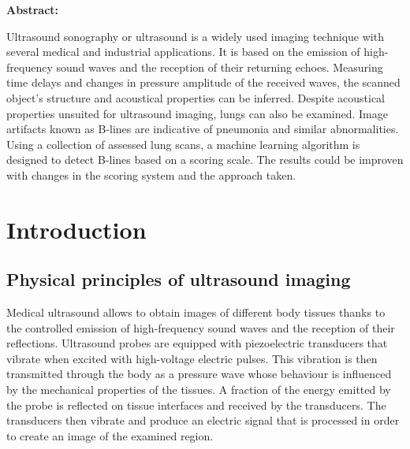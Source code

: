 \documentclass[12pt]{article} %
\begin{document}
{\bfseries \large Abstract: }\vspace{5mm} 

Ultrasound sonography or ultrasound is a widely used imaging technique with several medical and industrial applications. It is based on the emission of high-frequency sound waves and the reception of their returning echoes. Measuring time delays and changes in pressure amplitude of the received waves, the scanned object's structure and acoustical properties can be inferred. Despite acoustical properties unsuited for ultrasound imaging, lungs can also be examined. Image artifacts known as B-lines are indicative of pneumonia and similar abnormalities. Using a collection of assessed lung scans, a machine learning algorithm is designed to detect B-lines based on a scoring scale. The results could be improven with changes in the scoring system and the approach taken.
 
\vspace{1cm}

\newpage



\tableofcontents
\newpage


\normalsize
\section{Introduction}

\subsection{Physical principles of ultrasound imaging}


	Medical ultrasound allows to obtain images of different body tissues thanks to the controlled emission of high-frequency sound waves and the reception of their reflections. Ultrasound probes are equipped with piezoelectric transducers that vibrate when excited with high-voltage electric pulses. This vibration is then transmitted through the body as a pressure wave whose behaviour is influenced by the mechanical properties of the tissues. A fraction of the energy emitted by the probe is reflected on tissue interfaces and received by the transducers. The transducers then vibrate and produce an electric signal that is processed in order to create an image of the examined region. 
	
\end{document}
